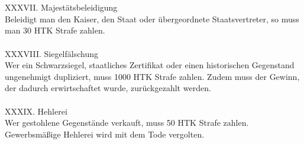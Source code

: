\documentclass{article}
\begin{document}
\\\\
XXXVII. Majestätsbeleidigung\\Beleidigt man den Kaiser, den Staat oder übergeordnete Staatsvertreter, so muss man 30 HTK Strafe zahlen.
\\\\
XXXVIII. Siegelfälschung\\Wer ein Schwarzsiegel, staatliches Zertifikat oder einen historischen Gegenstand ungenehmigt dupliziert, muss 1000 HTK Strafe zahlen. Zudem muss der Gewinn, der dadurch erwirtschaftet wurde, zurückgezahlt werden.
\\\\
XXXIX. Hehlerei\\Wer gestohlene Gegenstände verkauft, muss 50 HTK Strafe zahlen.\\Gewerbsmäßige Hehlerei wird mit dem Tode vergolten.
\end{document}
